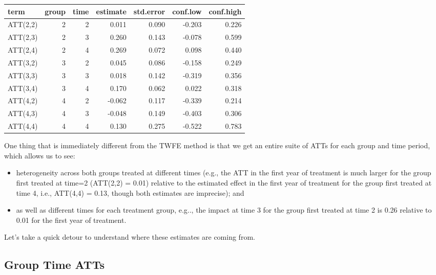 \documentclass[
]{article}
\providecommand{\tightlist}{%
  \setlength{\itemsep}{0pt}\setlength{\parskip}{0pt}}
\begin{document}
\begin{table}
\centering
\begin{tabular}[t]{l|r|r|r|r|r|r}
\hline
term & group & time & estimate & std.error & conf.low & conf.high\\
\hline
ATT(2,2) & 2 & 2 & 0.011 & 0.090 & -0.203 & 0.226\\
\hline
ATT(2,3) & 2 & 3 & 0.260 & 0.143 & -0.078 & 0.599\\
\hline
ATT(2,4) & 2 & 4 & 0.269 & 0.072 & 0.098 & 0.440\\
\hline
ATT(3,2) & 3 & 2 & 0.045 & 0.086 & -0.158 & 0.249\\
\hline
ATT(3,3) & 3 & 3 & 0.018 & 0.142 & -0.319 & 0.356\\
\hline
ATT(3,4) & 3 & 4 & 0.170 & 0.062 & 0.022 & 0.318\\
\hline
ATT(4,2) & 4 & 2 & -0.062 & 0.117 & -0.339 & 0.214\\
\hline
ATT(4,3) & 4 & 3 & -0.048 & 0.149 & -0.403 & 0.306\\
\hline
ATT(4,4) & 4 & 4 & 0.130 & 0.275 & -0.522 & 0.783\\
\hline
\end{tabular}
\end{table}

One thing that is immediately different from the TWFE method is that we
get an entire suite of ATTs for each group and time period, which allows
us to see:

\begin{itemize}
\tightlist
\item
  heterogeneity across both groups treated at different times (e.g., the
  ATT in the first year of treatment is much larger for the group first
  treated at time=2 (ATT(2,2) = 0.01) relative to the estimated effect
  in the first year of treatment for the group first treated at time 4,
  i.e., ATT(4,4) = 0.13, though both estimates are imprecise); and
\item
  as well as different times for each treatment group, e.g.., the impact
  at time 3 for the group first treated at time 2 is 0.26 relative to
  0.01 for the first year of treatment.
\end{itemize}

Let's take a quick detour to understand where these estimates are coming
from.

\hypertarget{group-time-atts}{%
\subsection{Group Time ATTs}\label{group-time-atts}}
\end{document}
